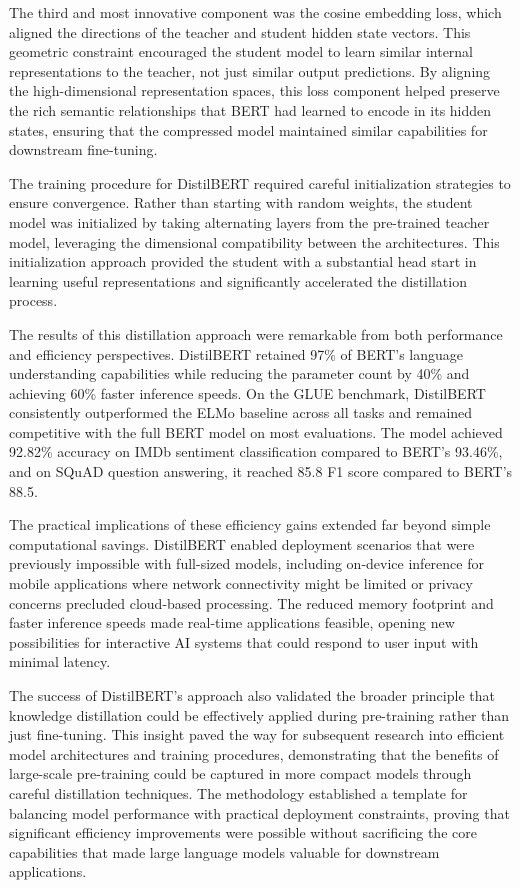 \documentclass[
  titlepage]{article}
\begin{document}
The third and most innovative component was the cosine embedding loss,
which aligned the directions of the teacher and student hidden state
vectors. This geometric constraint encouraged the student model to learn
similar internal representations to the teacher, not just similar output
predictions. By aligning the high-dimensional representation spaces,
this loss component helped preserve the rich semantic relationships that
BERT had learned to encode in its hidden states, ensuring that the
compressed model maintained similar capabilities for downstream
fine-tuning.

The training procedure for DistilBERT required careful initialization
strategies to ensure convergence. Rather than starting with random
weights, the student model was initialized by taking alternating layers
from the pre-trained teacher model, leveraging the dimensional
compatibility between the architectures. This initialization approach
provided the student with a substantial head start in learning useful
representations and significantly accelerated the distillation process.

The results of this distillation approach were remarkable from both
performance and efficiency perspectives. DistilBERT retained 97\% of
BERT's language understanding capabilities while reducing the parameter
count by 40\% and achieving 60\% faster inference speeds. On the GLUE
benchmark, DistilBERT consistently outperformed the ELMo baseline across
all tasks and remained competitive with the full BERT model on most
evaluations. The model achieved 92.82\% accuracy on IMDb sentiment
classification compared to BERT's 93.46\%, and on SQuAD question
answering, it reached 85.8 F1 score compared to BERT's 88.5.

The practical implications of these efficiency gains extended far beyond
simple computational savings. DistilBERT enabled deployment scenarios
that were previously impossible with full-sized models, including
on-device inference for mobile applications where network connectivity
might be limited or privacy concerns precluded cloud-based processing.
The reduced memory footprint and faster inference speeds made real-time
applications feasible, opening new possibilities for interactive AI
systems that could respond to user input with minimal latency.

The success of DistilBERT's approach also validated the broader
principle that knowledge distillation could be effectively applied
during pre-training rather than just fine-tuning. This insight paved the
way for subsequent research into efficient model architectures and
training procedures, demonstrating that the benefits of large-scale
pre-training could be captured in more compact models through careful
distillation techniques. The methodology established a template for
balancing model performance with practical deployment constraints,
proving that significant efficiency improvements were possible without
sacrificing the core capabilities that made large language models
valuable for downstream applications.
\end{document}
